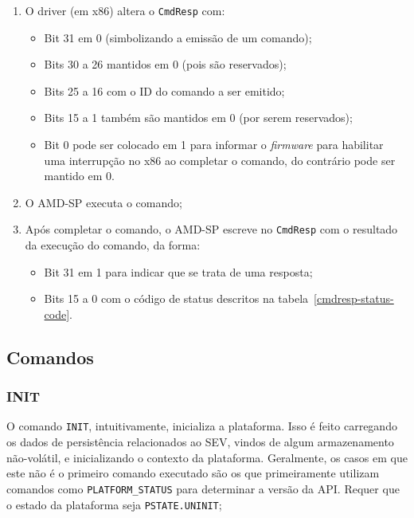 \documentclass{report}
\begin{document}
\begin{enumerate}
    \item O driver (em x86) altera o \texttt{CmdResp} com:
        \begin{itemize}
            \item Bit 31 em 0 (simbolizando a emissão de um comando);
            \item Bits 30 a 26 mantidos em 0 (pois são reservados);
            \item Bits 25 a 16 com o ID do comando a ser emitido;
            \item Bits 15 a 1 também são mantidos em 0 (por serem reservados);
            \item Bit 0 pode ser colocado em 1 para informar o
                \textit{firmware} para habilitar uma interrupção no x86 ao
                completar o comando, do contrário pode ser mantido em 0.
        \end{itemize}
    \item O AMD-SP executa o comando;
    \item Após completar o comando, o AMD-SP escreve no \texttt{CmdResp} com o
        resultado da execução do comando, da forma:
        \begin{itemize}
            \item Bit 31 em 1 para indicar que se trata de uma resposta;
            \item Bits 15 a 0 com o código de status descritos na
                tabela~\ref{cmdresp-status-code}.
        \end{itemize}
\end{enumerate}

\subsection{Comandos}

\subsubsection{INIT}

O comando \texttt{INIT}, intuitivamente, inicializa a plataforma. Isso é feito
carregando os dados de persistência relacionados ao SEV, vindos de algum
armazenamento não-volátil, e inicializando o contexto da plataforma.
Geralmente, os casos em que este não é o primeiro comando executado são os que
primeiramente utilizam comandos como \texttt{PLATFORM\_STATUS} para determinar
a versão da API\@. Requer que o estado da plataforma seja
\texttt{PSTATE.UNINIT};
\end{document}
